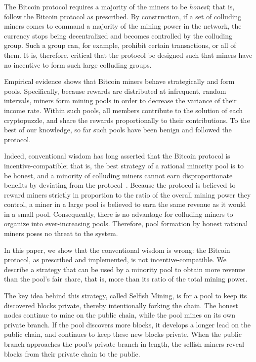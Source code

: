 \documentclass[letterpaper]{llncs}
\begin{document}
The Bitcoin protocol requires a majority of the miners to be \emph{honest}; that is, follow the Bitcoin protocol as prescribed. 
By construction, if a set of colluding miners comes to command a majority of the mining power in the network, the currency stops being decentralized and becomes
controlled by the colluding group.  Such a group can, for example, prohibit certain transactions, or all of them. 
It is, therefore, critical that the protocol be designed such that miners have no incentive to form such large colluding groups.

Empirical evidence shows that Bitcoin miners behave strategically and form pools. 
Specifically, because rewards are distributed at infrequent, random intervals, miners form mining pools in order to decrease the variance of their income rate. 
Within such pools, all members contribute to the solution of each cryptopuzzle, and share the rewards proportionally to their contributions. 
To the best of our knowledge, so far such pools have been benign and followed the protocol. 
    
Indeed, conventional wisdom has long asserted that the Bitcoin protocol is incentive-compatible; that is, the best strategy of a rational minority pool is to be honest, and a minority of colluding miners cannot earn disproportionate benefits by deviating from the protocol~\cite{barber2012bitter}. 
Because the protocol is believed to reward miners strictly in proportion to the ratio of the overall mining power they control, 
a miner in a large pool is believed to earn the same revenue as it would in a small pool. Consequently, 
there is no advantage for colluding miners to organize into ever-increasing pools. 
Therefore, pool formation by honest rational miners poses no threat to the system. 

In this paper, we show that the conventional wisdom is wrong: the Bitcoin protocol, as prescribed and implemented, is not incentive-compatible.
We describe a strategy that can be used by a minority pool to obtain more revenue than the pool's fair share, that is, more than its ratio of the total mining power. 

The key idea behind this strategy, called Selfish Mining, is for a pool to keep its discovered blocks private, thereby intentionally forking the chain. The honest nodes
continue to mine on the public chain, while the pool mines on its own private branch. If the pool discovers more blocks, it develops a longer lead on the public chain,
and continues to keep these new blocks private. When the public branch approaches the pool's private branch in length, the selfish miners reveal blocks from their private chain to the public. 
\end{document}
